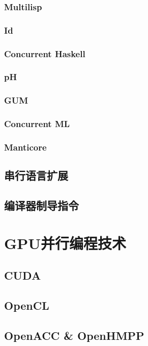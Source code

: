 \subsubsection{Multilisp}

\subsubsection{Id}

\subsubsection{Concurrent Haskell}

\subsubsection{pH}

\subsubsection{GUM}

\subsubsection{Concurrent ML}

\subsubsection{Manticore}

\subsection{串行语言扩展}

\subsection{编译器制导指令}

\section{GPU并行编程技术}

\subsection{CUDA}

\subsection{OpenCL}

\subsection{OpenACC \& OpenHMPP}
